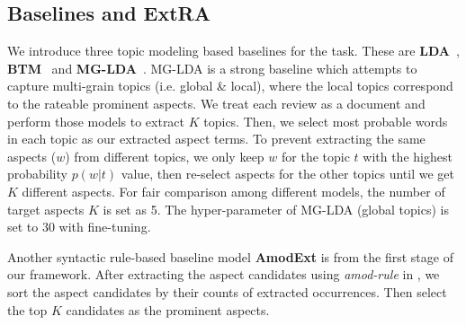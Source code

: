 %		
%		



\subsection{Baselines and ExtRA}
\label{sec:base}
We introduce three topic modeling based baselines for the task.
These are \textbf{LDA}~\cite{Blei2003LatentDA}, 
\textbf{BTM}~\cite{cheng2014btm} and  
\textbf{MG-LDA}~\cite{titov2008modeling}. MG-LDA is a strong
baseline which attempts to capture multi-grain topics (i.e. global \& local), where the local topics correspond to the rateable prominent aspects.
We treat each review as a document and perform those models
to extract $K$ topics.
Then, we select most probable words in 
each topic as our extracted aspect terms. 
To prevent extracting the same aspects ($w$) from different topics, 
we only keep $w$ for the topic $t$ with the highest 
probability $p(w|t)$ value, then re-select aspects for the other 
topics until we get $K$ different aspects. 
For fair comparison among different models, the number of 
target aspects $K$ is set as 5. The hyper-parameter of 
MG-LDA (global topics) is set to 30 with fine-tuning.

Another syntactic rule-based baseline model 
\textbf{AmodExt} is from the first stage of our framework. 
After extracting the aspect candidates using
\emph{amod-rule} in , 
we sort the aspect candidates by 
their counts of extracted occurrences. 
Then select the top $K$ 
candidates as the prominent aspects.

